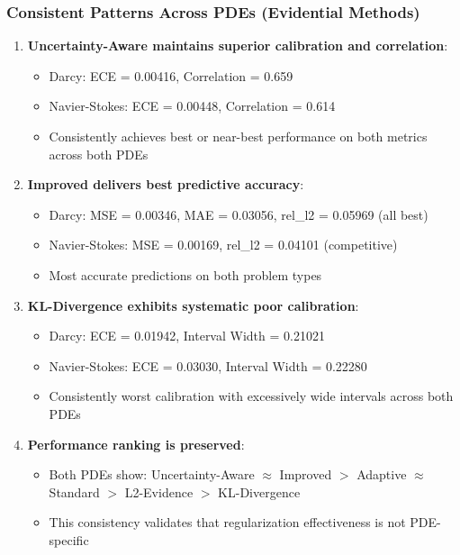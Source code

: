\subsubsection{Consistent Patterns Across PDEs (Evidential Methods)}

\begin{enumerate}
\item \textbf{Uncertainty-Aware maintains superior calibration and correlation}:
\begin{itemize}
\item Darcy: ECE = 0.00416, Correlation = 0.659
\item Navier-Stokes: ECE = 0.00448, Correlation = 0.614
\item Consistently achieves best or near-best performance on both metrics across both PDEs
\end{itemize}

\item \textbf{Improved delivers best predictive accuracy}:
\begin{itemize}
\item Darcy: MSE = 0.00346, MAE = 0.03056, rel\_l2 = 0.05969 (all best)
\item Navier-Stokes: MSE = 0.00169, rel\_l2 = 0.04101 (competitive)
\item Most accurate predictions on both problem types
\end{itemize}

\item \textbf{KL-Divergence exhibits systematic poor calibration}:
\begin{itemize}
\item Darcy: ECE = 0.01942, Interval Width = 0.21021
\item Navier-Stokes: ECE = 0.03030, Interval Width = 0.22280
\item Consistently worst calibration with excessively wide intervals across both PDEs
\end{itemize}

\item \textbf{Performance ranking is preserved}:
\begin{itemize}
\item Both PDEs show: Uncertainty-Aware $\approx$ Improved $>$ Adaptive $\approx$ Standard $>$ L2-Evidence $>$ KL-Divergence
\item This consistency validates that regularization effectiveness is not PDE-specific
\end{itemize}
\end{enumerate}


